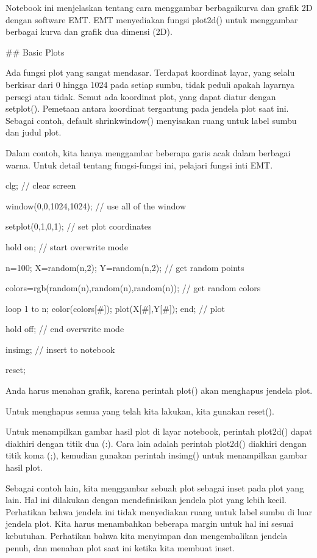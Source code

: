 \documentclass{article}
\begin{document}
Notebook ini menjelaskan tentang cara menggambar berbagaikurva dan
grafik 2D dengan software EMT. EMT menyediakan fungsi plot2d() untuk
menggambar berbagai kurva dan grafik dua dimensi (2D).


## Basic Plots

Ada fungsi plot yang sangat mendasar. Terdapat koordinat layar, yang
selalu berkisar dari 0 hingga 1024 pada setiap sumbu, tidak peduli
apakah layarnya persegi atau tidak. Semut ada koordinat plot, yang
dapat diatur dengan setplot(). Pemetaan antara koordinat tergantung
pada jendela plot saat ini. Sebagai contoh, default shrinkwindow()
menyisakan ruang untuk label sumbu dan judul plot.


Dalam contoh, kita hanya menggambar beberapa garis acak dalam berbagai
warna. Untuk detail tentang fungsi-fungsi ini, pelajari fungsi inti
EMT.


\>clg; // clear screen

\>window(0,0,1024,1024); // use all of the window

\>setplot(0,1,0,1); // set plot coordinates

\>hold on; // start overwrite mode

\>n=100; X=random(n,2); Y=random(n,2);  // get random points

\>colors=rgb(random(n),random(n),random(n)); // get random colors

\>loop 1 to n; color(colors[#]); plot(X[#],Y[#]); end; // plot

\>hold off; // end overwrite mode

\>insimg; // insert to notebook


\>reset;


Anda harus menahan grafik, karena perintah plot() akan menghapus
jendela plot.


Untuk menghapus semua yang telah kita lakukan, kita gunakan reset().


Untuk menampilkan gambar hasil plot di layar notebook, perintah
plot2d() dapat diakhiri dengan titik dua (:). Cara lain adalah
perintah plot2d() diakhiri dengan titik koma (;), kemudian gunakan
perintah insimg() untuk menampilkan gambar hasil plot.


Sebagai contoh lain, kita menggambar sebuah plot sebagai inset pada
plot yang lain. Hal ini dilakukan dengan mendefinisikan jendela plot
yang lebih kecil. Perhatikan bahwa jendela ini tidak menyediakan ruang
untuk label sumbu di luar jendela plot. Kita harus menambahkan
beberapa margin untuk hal ini sesuai kebutuhan. Perhatikan bahwa kita
menyimpan dan mengembalikan jendela penuh, dan menahan plot saat ini
ketika kita membuat inset.
\end{document}

